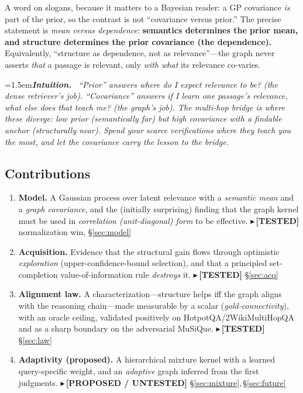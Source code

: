 \documentclass[11pt]{article}
\newcommand{\TESTED}[1]{{\color{teal}\small$\blacktriangleright$\,\textbf{[TESTED]} #1}}
\newcommand{\PROP}[1]{{\color{violet}\small$\blacktriangleright$\,\textbf{[PROPOSED / UNTESTED]} #1}}
\newenvironment{intuition}{\par\smallskip\noindent\hangindent=1.5em\textbf{\itshape Intuition.}\itshape\ \ignorespaces}{\par\smallskip}
\begin{document}
A word on slogans, because it matters to a Bayesian reader: a GP covariance \emph{is} part of the prior, so the
contrast is not ``covariance versus prior.'' The precise statement is \emph{mean versus dependence}:
\textbf{semantics determines the prior mean, and structure determines the prior covariance (the dependence).}
Equivalently, ``structure as dependence, not as relevance''---the graph never asserts \emph{that} a passage is
relevant, only \emph{with what} its relevance co-varies.

\begin{intuition}
``Prior'' answers \emph{where do I expect relevance to be?} (the dense retriever's job). ``Covariance'' answers
\emph{if I learn one passage's relevance, what else does that teach me?} (the graph's job). The multi-hop bridge
is where these diverge: low prior (semantically far) but high covariance with a findable anchor (structurally
near). Spend your scarce verifications where they teach you the most, and let the covariance carry the lesson to
the bridge.
\end{intuition}

\subsection{Contributions}
\begin{enumerate}[leftmargin=*,itemsep=1pt]
  \item \textbf{Model.} A Gaussian process over latent relevance with a \emph{semantic mean} and a \emph{graph
  covariance}, and the (initially surprising) finding that the graph kernel must be used in \emph{correlation
  (unit-diagonal) form} to be effective. \TESTED{normalization win, \S\ref{sec:model}}
  \item \textbf{Acquisition.} Evidence that the structural gain flows through optimistic \emph{exploration}
  (upper-confidence-bound selection), and that a principled set-completion value-of-information rule
  \emph{destroys} it. \TESTED{\S\ref{sec:acq}}
  \item \textbf{Alignment law.} A characterization---structure helps iff the graph aligns with the reasoning
  chain---made measurable by a scalar (\emph{gold-connectivity}), with an oracle ceiling, validated positively
  on HotpotQA/2WikiMultiHopQA and as a sharp boundary on the adversarial MuSiQue. \TESTED{\S\ref{sec:law}}
  \item \textbf{Adaptivity (proposed).} A hierarchical mixture kernel with a learned query-specific weight, and
  an \emph{adaptive} graph inferred from the first judgments. \PROP{\S\ref{sec:mixture},\,\S\ref{sec:future}}
\end{enumerate}
\end{document}
